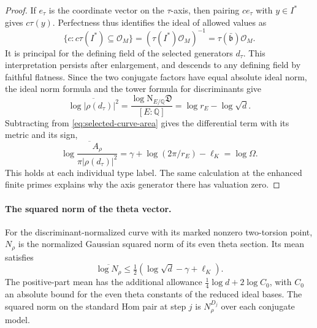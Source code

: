 \begin{proof}
If \(e_\tau\) is the coordinate vector on the \(\tau\)-axis,
then pairing \(ce_\tau\) with \(y\in I^*\) gives \(c\tau(y)\).
Perfectness thus identifies the ideal of allowed values as
\[
 \{c:c\tau(I^*)\subseteq\mathcal O_M\}
      =(\tau(I^*)\mathcal O_M)^{-1}
      =\tau(\bar{\mathfrak b})\mathcal O_M .
\]
It is principal for the defining field of the selected
generators \(d_\tau\). This interpretation persists after
enlargement, and descends to any defining field by faithful flatness.
Since the two conjugate factors have equal absolute ideal norm,
the ideal norm formula and the tower formula for discriminants give
\[
  \overline{\log |\rho(d_\tau)|^2}
   =\frac{\log\mathrm N_{E/\mathbb Q}\mathfrak D}{[E:\mathbb Q]}
   =\log r_E-\log\sqrt d .
\]
Subtracting from \eqref{eq:selected-curve-area} gives the
differential term with its metric and its sign,
\begin{equation}\label{eq:selected-generator-mean}
  \overline{\log\frac{A_\rho}{\pi|\rho(d_\tau)|^2}}
     =\gamma+\log(2\pi/r_E)-\ell_K=\log\Omega .
\end{equation}
This holds at each individual type label. The same calculation
at the enhanced finite primes explains why the axis generator
there has valuation zero.
\end{proof}

\paragraph{The squared norm of the theta vector.}
\begin{proposition}\label{prop:mean-reference-theta-norm}
For the discriminant-normalized curve with its marked
nonzero two-torsion point, \(N_\rho\) is the normalized
Gaussian squared norm of its even theta section. Its mean satisfies
\[
 \overline{\log N_\rho}\le\tfrac12(\log\sqrt d-\gamma+\ell_K).
\]
The positive-part mean has the additional allowance
\(\tfrac14\log d+2\log C_0\), with \(C_0\) an absolute bound
for the even theta constants of the reduced ideal bases.
The squared norm on the standard Hom pair at step \(j\)
is \(N_\rho^{D_j}\) over each conjugate model.
\end{proposition}

